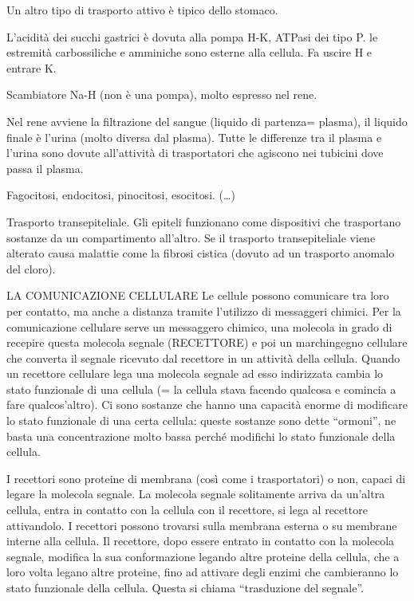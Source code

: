 \documentclass[]{article}
\begin{document}
Un altro tipo di trasporto attivo è tipico dello stomaco.

L'acidità dei succhi gastrici è dovuta alla pompa H-K, ATPasi dei tipo
P. le estremità carbossiliche e amminiche sono esterne alla cellula. Fa
uscire H e entrare K.

Scambiatore Na-H (non è una pompa), molto espresso nel rene.

Nel rene avviene la filtrazione del sangue (liquido di partenza=
plasma), il liquido finale è l'urina (molto diversa dal plasma). Tutte
le differenze tra il plasma e l'urina sono dovute all'attività di
trasportatori che agiscono nei tubicini dove passa il plasma.

Fagocitosi, endocitosi, pinocitosi, esocitosi. (\ldots{})

Trasporto transepiteliale. Gli epiteli funzionano come dispositivi che
trasportano sostanze da un compartimento all'altro. Se il trasporto
transepiteliale viene alterato causa malattie come la fibrosi cistica
(dovuto ad un trasporto anomalo del cloro).

LA COMUNICAZIONE CELLULARE Le cellule possono comunicare tra loro per
contatto, ma anche a distanza tramite l'utilizzo di messaggeri chimici.
Per la comunicazione cellulare serve un messaggero chimico, una molecola
in grado di recepire questa molecola segnale (RECETTORE) e poi un
marchingegno cellulare che converta il segnale ricevuto dal recettore in
un attività della cellula. Quando un recettore cellulare lega una
molecola segnale ad esso indirizzata cambia lo stato funzionale di una
cellula (= la cellula stava facendo qualcosa e comincia a fare
qualcos'altro). Ci sono sostanze che hanno una capacità enorme di
modificare lo stato funzionale di una certa cellula: queste sostanze
sono dette ``ormoni'', ne basta una concentrazione molto bassa perché
modifichi lo stato funzionale della cellula.

I recettori sono proteine di membrana (così come i trasportatori) o non,
capaci di legare la molecola segnale. La molecola segnale solitamente
arriva da un'altra cellula, entra in contatto con la cellula con il
recettore, si lega al recettore attivandolo. I recettori possono
trovarsi sulla membrana esterna o su membrane interne alla cellula. Il
recettore, dopo essere entrato in contatto con la molecola segnale,
modifica la sua conformazione legando altre proteine della cellula, che
a loro volta legano altre proteine, fino ad attivare degli enzimi che
cambieranno lo stato funzionale della cellula. Questa si chiama
``trasduzione del segnale''.
\end{document}
